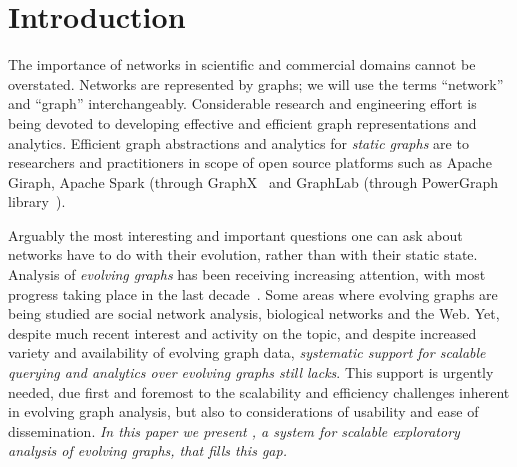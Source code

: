 \section{Introduction}
\label{sec:intro}

The importance of networks in scientific and commercial domains cannot
be overstated.  Networks are represented by graphs; we will use
the terms ``network'' and ``graph'' interchangeably.  Considerable
research and engineering effort is being devoted to developing
effective and efficient graph representations and analytics.
Efficient graph abstractions and analytics for {\em static graphs} are
to researchers and practitioners in scope of open source platforms
such as Apache Giraph, Apache Spark (through
GraphX~\cite{DBLP:conf/osdi/GonzalezXDCFS14} and GraphLab (through
PowerGraph library~\cite{DBLP:conf/osdi/GonzalezLGBG12}).

Arguably the most interesting and important questions one can ask
about networks have to do with their evolution, rather than with their
static state.  Analysis of {\em evolving graphs} has been receiving
increasing attention, with most progress taking place in the last
decade~\cite{DBLP:journals/csur/AggarwalS14,Chan2008,Kan2009,DBLP:journals/tos/MiaoHLWYZPCC15,Ren2011,Semertzidis2015}.
Some areas where evolving graphs are being studied are social network
analysis,
biological networks and the Web.
%
Yet, despite much recent interest and activity on the topic, and
despite increased variety and availability of evolving graph data,
{\em systematic support for scalable querying and analytics over
  evolving graphs still lacks}.  This support is urgently needed, due
first and foremost to the scalability and efficiency challenges
inherent in evolving graph analysis, but also to considerations of
usability and ease of dissemination.  {\em In this paper we present
  \ql, a system for scalable exploratory analysis of evolving graphs,
  that fills this gap.}

